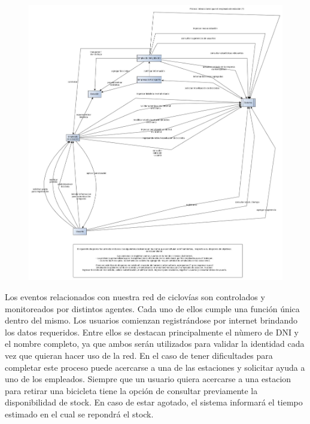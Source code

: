 \begin{figure}[H]
	\begin{center}
		  \includegraphics[scale=0.35]{diagrama_contexto.jpg}
		  \caption{}
		  \label{fig:contra1}
	\end{center}
\end{figure}

Los eventos relacionados con nuestra red de ciclovías son controlados y monitoreados por distintos agentes. Cada uno de ellos cumple una función única dentro del mismo.
Los usuarios comienzan registrándose por internet brindando los datos requeridos. Entre ellos se destacan principalmente el nùmero de DNI y el nombre completo, ya que ambos serán utilizados
para validar la identidad cada vez que quieran hacer uso de la red. En el caso de tener dificultades para completar este proceso puede acercarse a una de las estaciones y solicitar ayuda a uno de los empleados.
Siempre que un usuario quiera acercarse a una estacion para retirar una bicicleta tiene la opción de consultar previamente la disponibilidad de stock. En caso de estar agotado, el sistema informará el tiempo
estimado en el cual se repondrá el stock.
